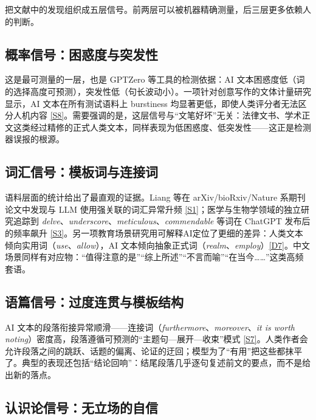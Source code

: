 \documentclass[10pt,a4paper]{ctexart}
\begin{document}
\begin{justifying}
把文献中的发现组织成五层信号。前两层可以被机器精确测量，后三层更多依赖人的判断。

\subsection{概率信号：困惑度与突发性}

这是最可测量的一层，也是 GPTZero 等工具的检测依据：AI 文本困惑度低（词的选择高度可预测），突发性低（句长波动小）。一项针对创意写作的文体计量研究显示，AI 文本在所有测试语料上 burstiness 均显著更低，即使人类评分者无法区分人机内容 \href{https://www.eyesift.com/blog/ai-writing-style-vs-human-writing/}{[S8]}。需要强调的是，这层信号与“文笔好坏”无关：法律文书、学术正文这类经过精修的正式人类文本，同样表现为低困惑度、低突发性——这正是检测器误报的根源。

\subsection{词汇信号：模板词与连接词}

语料层面的统计给出了最直观的证据。Liang 等在 arXiv/bioRxiv/Nature 系期刊论文中发现与 LLM 使用强关联的词汇异常升频 \href{https://arxiv.org/abs/2404.01268}{[S1]}；医学与生物学领域的独立研究追踪到 \textit{delve}、\textit{underscore}、\textit{meticulous}、\textit{commendable} 等词在 ChatGPT 发布后的频率飙升 \href{https://www.medrxiv.org/content/10.1101/2024.05.14.24307373v1}{[S3]}。另一项教育场景研究用可解释AI定位了更细的差异：人类文本倾向实用词（\textit{use}、\textit{allow}），AI 文本倾向抽象正式词（\textit{realm}、\textit{employ}）\href{https://arxiv.org/abs/2501.03203}{[D7]}。中文场景同样有对应物：“值得注意的是”“综上所述”“不言而喻”“在当今……”这类高频套语。

\subsection{语篇信号：过度连贯与模板结构}

AI 文本的段落衔接异常顺滑——连接词（\textit{furthermore}、\textit{moreover}、\textit{it is worth noting}）密度高，段落遵循可预测的“主题句—展开—收束”模式 \href{https://www.eyesift.com/blog/ai-writing-style-vs-human-writing/}{[S7]}。人类作者会允许段落之间的跳跃、话题的偏离、论证的迂回；模型为了“有用”把这些都抹平了。典型的表现还包括“结论回响”：结尾段落几乎逐句复述前文的要点，而不是给出新的落点。

\subsection{认识论信号：无立场的自信}


\end{justifying}
\end{document}

